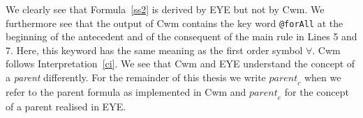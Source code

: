 % 
% 
We clearly see that Formula~\ref{ss2} is derived by EYE but not by Cwm. 
We furthermore see that the output of Cwm contains the key word \texttt{@forAll} at the beginning of the antecedent and of the consequent of the main rule in Lines 5 and 7. 
Here, this keyword has the same meaning as the first order symbol $\forall$. Cwm follows Interpretation~\ref{ci}.  We see that 
Cwm and EYE understand the concept of a \emph{parent} differently. 
For the remainder of this thesis we write $\textit{parent}_c$ when we refer to the parent formula as implemented in Cwm and $\textit{parent}_e$ 
for the concept of a parent realised in EYE.

